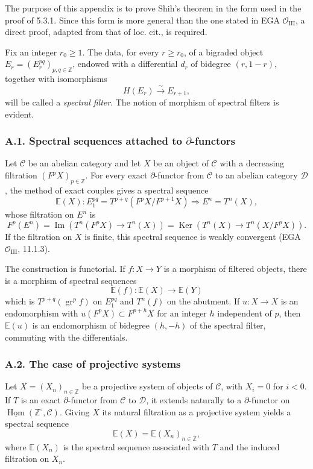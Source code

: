 \documentclass[12pt]{article}
\newcommand{\bZ}{\mathbb Z}
\newcommand{\cC}{\mathcal C}
\newcommand{\cD}{\mathcal D}
\newcommand{\Hom}{\operatorname{Hom}}
\newcommand{\Ker}{\operatorname{Ker}}
\newcommand{\Imn}{\operatorname{Im}}
\newcommand{\gr}{\operatorname{gr}}
\begin{document}
The purpose of this appendix is to prove Shih's theorem in the form used in the proof
of 5.3.1. Since this form is more general than the one stated in EGA $\mathcal O_{\mathrm{III}}$,
a direct proof, adapted from that of loc. cit., is required.

Fix an integer $r_0\ge1$. The data, for every $r\ge r_0$, of a bigraded object
$E_r=(E_r^{pq})_{p,q\in\bZ}$, endowed with a differential $d_r$ of bidegree
$(r,1-r)$, together with isomorphisms
\[
        H(E_r)\xrightarrow{\sim}E_{r+1},
\]
will be called a \emph{spectral filter}. The notion of morphism of spectral filters
is evident.

\subsubsection*{A.1. Spectral sequences attached to $\partial$-functors}

Let $\cC$ be an abelian category and let $X$ be an object of $\cC$ with a decreasing
filtration $(F^pX)_{p\in\bZ}$. For every exact $\partial$-functor from $\cC$ to an
abelian category $\cD$, the method of exact couples gives a spectral sequence
\[
        \mathbb E(X):E_1^{pq}=T^{p+q}(F^pX/F^{p+1}X)
        \Rightarrow E^n=T^n(X),
\]
whose filtration on $E^n$ is
\[
        F^p(E^n)=\Imn(T^n(F^pX)\to T^n(X))
        =\Ker(T^n(X)\to T^n(X/F^pX)).
\]
If the filtration on $X$ is finite, this spectral sequence is weakly convergent
(EGA $\mathcal O_{\mathrm{III}}$, 11.1.3).

The construction is functorial. If $f:X\to Y$ is a morphism of filtered objects,
there is a morphism of spectral sequences
\[
        \mathbb E(f):\mathbb E(X)\to\mathbb E(Y)
\]
which is $T^{p+q}(\gr^p f)$ on $E_1^{pq}$ and $T^n(f)$ on the abutment. If
$u:X\to X$ is an endomorphism with $u(F^pX)\subset F^{p+h}X$ for an integer $h$
independent of $p$, then $\mathbb E(u)$ is an endomorphism of bidegree $(h,-h)$ of
the spectral filter, commuting with the differentials.

\subsubsection*{A.2. The case of projective systems}

Let $X=(X_n)_{n\in\bZ}$ be a projective system of objects of $\cC$, with
$X_i=0$ for $i<0$. If $T$ is an exact $\partial$-functor from $\cC$ to $\cD$, it
extends naturally to a $\partial$-functor on
$\underline{\Hom}(\bZ^\circ,\cC)$. Giving $X$ its natural filtration as a projective
system yields a spectral sequence
\[
       \mathbb E(X)=\mathbb E(X_n)_{n\in\bZ},
\]
where $\mathbb E(X_n)$ is the spectral sequence associated with $T$ and the induced
filtration on $X_n$.
\end{document}
